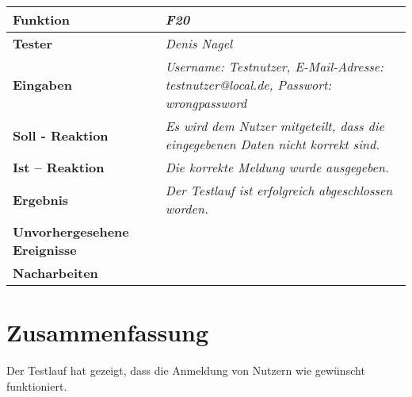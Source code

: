 \newpage
\begin{longtable}{|p{4cm}|p{11cm}|}
\hline
\textbf{Funktion} & \textit{\textbf{F20}} \\
\hline
\textbf{Tester} & \textit{Denis Nagel} \\
\hline
\textbf{Eingaben} & \textit{Username: Testnutzer, E-Mail-Adresse: testnutzer@local.de, Passwort: wrongpassword} \\
\hline
\textbf{Soll - Reaktion} & \textit{Es wird dem Nutzer mitgeteilt, dass die eingegebenen Daten nicht korrekt sind.} \\
\hline
\textbf{Ist -- Reaktion} & \textit{Die korrekte Meldung wurde ausgegeben.} \\
\hline
\textbf{Ergebnis} & \textit{Der Testlauf ist erfolgreich abgeschlossen worden.} \\
\hline
\textbf{Unvorhergesehene Ereignisse} &
\textit{} \\
\hline
\textbf{Nacharbeiten } & \textit{} \\
\hline
\end{longtable}

\section{Zusammenfassung}

Der Testlauf hat gezeigt, dass die Anmeldung von Nutzern wie gewünscht funktioniert.

